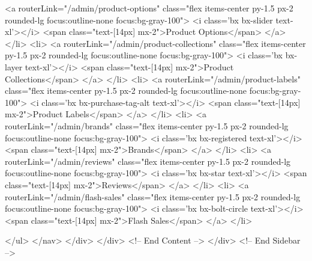                         <a routerLink="/admin/product-options"
                            class="flex items-center py-1.5 px-2 rounded-lg focus:outline-none focus:bg-gray-100">
                            <i class='bx bx-slider text-xl'></i>
                            <span class="text-[14px] mx-2">Product Options</span>
                        </a>
                    </li>
                    <li>
                        <a routerLink="/admin/product-collections"
                            class="flex items-center py-1.5 px-2 rounded-lg focus:outline-none focus:bg-gray-100">
                            <i class='bx bx-layer text-xl'></i>
                            <span class="text-[14px] mx-2">Product Collections</span>
                        </a>
                    </li>
                    <li>
                        <a routerLink="/admin/product-labels"
                            class="flex items-center py-1.5 px-2 rounded-lg focus:outline-none focus:bg-gray-100">
                            <i class='bx bx-purchase-tag-alt text-xl'></i>
                            <span class="text-[14px] mx-2">Product Labels</span>
                        </a>
                    </li>
                    <li>
                        <a routerLink="/admin/brands"
                            class="flex items-center py-1.5 px-2 rounded-lg focus:outline-none focus:bg-gray-100">
                            <i class='bx bx-registered text-xl'></i>
                            <span class="text-[14px] mx-2">Brands</span>
                        </a>
                    </li>
                    <li>
                        <a routerLink="/admin/reviews"
                            class="flex items-center py-1.5 px-2 rounded-lg focus:outline-none focus:bg-gray-100">
                            <i class='bx bx-star text-xl'></i>
                            <span class="text-[14px] mx-2">Reviews</span>
                        </a>
                    </li>
                    <li>
                        <a routerLink="/admin/flash-sales"
                            class="flex items-center py-1.5 px-2 rounded-lg focus:outline-none focus:bg-gray-100">
                            <i class='bx bx-bolt-circle text-xl'></i>
                            <span class="text-[14px] mx-2">Flash Sales</span>
                        </a>
                    </li>

                </ul>
            </nav>
        </div>
    </div>
    <!-- End Content -->
</div>
<!-- End Sidebar -->



















